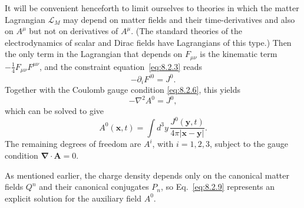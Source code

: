 It will be convenient henceforth to limit ourselves to theories in which
the matter Lagrangian $\mathcal L_M$ may depend on matter fields and their
time-derivatives and also on $A^\mu$ but not on derivatives of $A^\mu$. (The
standard theories of the electrodynamics of scalar and Dirac fields have
Lagrangians of this type.) Then the only term in the Lagrangian that depends
on $F_{\mu\nu}$ is the kinematic term $-\tfrac14F_{\mu\nu}F^{\mu\nu}$, and the
constraint equation~\eqref{eq:8.2.3} reads
\begin{equation}
  -\partial_iF^{i0}=J^0.
  \tag{8.2.7}\label{eq:8.2.7}
\end{equation}
Together with the Coulomb gauge condition \eqref{eq:8.2.6}, this yields
\begin{equation}
  -\nabla^2A^0=J^0,
  \tag{8.2.8}\label{eq:8.2.8}
\end{equation}
which can be solved to give
\begin{equation}
  A^0(\mathbf x,t)=\int d^3y\,
  \frac{J^0(\mathbf y,t)}{4\pi\lvert\mathbf x-\mathbf y\rvert}.
  \tag{8.2.9}\label{eq:8.2.9}
\end{equation}
The remaining degrees of freedom are $A^i$, with $i=1,2,3$, subject to the
gauge condition $\boldsymbol\nabla\cdot\mathbf A=0$.

As mentioned earlier, the charge density depends only on the canonical
matter fields $Q^n$ and their canonical conjugates $P_n$, so Eq.~\eqref{eq:8.2.9}
represents an explicit solution for the auxiliary field $A^0$.
